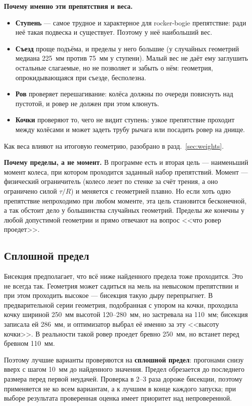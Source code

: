 \documentclass[11pt,a4paper]{article}
\begin{document}
\textbf{Почему именно эти препятствия и веса.}
\begin{itemize}
  \item \textbf{Ступень} --- самое трудное и характерное для rocker-bogie препятствие: ради неё
        такая подвеска и существует. Поэтому у неё наибольший вес.
  \item \textbf{Съезд} проще подъёма, и пределы у него большие (у случайных геометрий медиана
        225~мм против 75~мм у ступени). Малый вес не даёт ему заглушить остальные слагаемые,
        но не позволяет и забыть о нём: геометрия, опрокидывающаяся при съезде, бесполезна.
  \item \textbf{Ров} проверяет перешагивание: колёса должны по очереди повиснуть над пустотой,
        и ровер не должен при этом клюнуть.
  \item \textbf{Кочки} проверяют то, чего не видит ступень: узкое препятствие проходит между
        колёсами и может задеть трубу рычага или посадить ровер на днище.
\end{itemize}
Как веса влияют на итоговую геометрию, разобрано в разд.~\ref{sec:weights}.

\textbf{Почему пределы, а не момент.} В программе есть и вторая цель --- наименьший момент колеса,
при котором проходится заданный набор препятствий. Момент --- физический ограничитель
(колесо лезет по стенке за счёт трения, а оно ограничено силой $\tau/R$) и меняется
с геометрией плавно. Но если хоть одно препятствие непроходимо при любом моменте, эта цель
становится бесконечной, а так обстоит дело у большинства случайных геометрий. Пределы же
конечны у любой допустимой геометрии и прямо отвечают на вопрос <<что ровер проедет>>.

\subsection{Сплошной предел}
\label{sec:continuous}

Бисекция предполагает, что всё ниже найденного предела тоже проходится. Это не всегда так.
Геометрия может садиться на мель на невысоком препятствии и при этом проходить высокое ---
бисекция такую дыру перепрыгнет. В предварительной серии геометрия, подобранная с упором
на кочки, проходила кочку шириной 250~мм высотой 120--280~мм, но застревала на 110~мм;
бисекция записала ей 286~мм, и оптимизатор выбрал её именно за эту <<высоту кочки>>.
В реальности такой ровер проедет бревно 250~мм, но встанет перед бревном 110~мм.

Поэтому лучшие варианты проверяются на \textbf{сплошной предел}: прогонами снизу вверх
с шагом 10~мм до найденного значения. Предел обрезается до последнего размера перед первой
неудачей. Проверка в 2--3 раза дороже бисекции, поэтому применяется не ко всем вариантам,
а к лучшим в конце каждого запуска; при выборе результата проверенная оценка имеет приоритет
над непроверенной.
\end{document}
